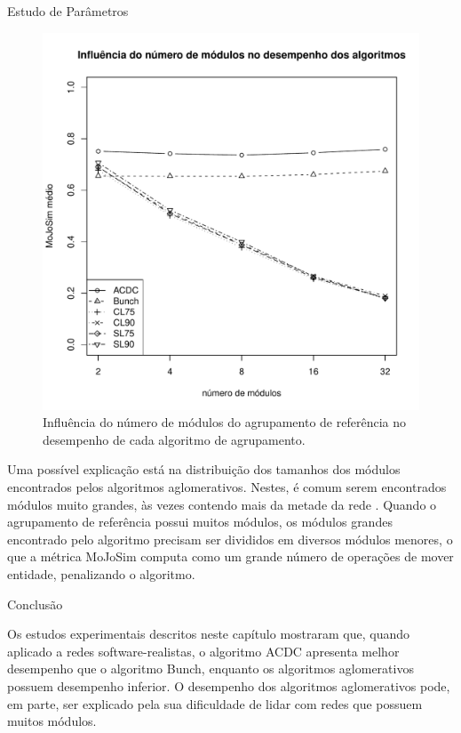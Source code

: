 \begin{section}{Estudo de Parâmetros}
\begin{figure}[htbp]
	\centering
		\includegraphics[scale=0.5]{figuras/mojosim-vs-modules}
	\caption{Influência do número de módulos do agrupamento de referência no desempenho de cada algoritmo de agrupamento.}
	\label{fig:mojosim-vs-modules}
\end{figure}

Uma possível explicação está na distribuição dos tamanhos dos módulos encontrados pelos algoritmos aglomerativos. Nestes, é comum serem encontrados módulos muito grandes, às vezes contendo mais da metade da rede \cite{Wu2005}. Quando o agrupamento de referência possui muitos módulos, os módulos grandes encontrado pelo algoritmo precisam ser divididos em diversos módulos menores, o que a métrica MoJoSim computa como um grande número de operações de mover entidade, penalizando o algoritmo.


\end{section}

\begin{section}{Conclusão}

Os estudos experimentais descritos neste capítulo mostraram que, quando aplicado a redes software-realistas, o algoritmo ACDC apresenta melhor desempenho que o algoritmo Bunch, enquanto os algoritmos aglomerativos possuem desempenho inferior. O desempenho dos algoritmos aglomerativos pode, em parte, ser explicado pela sua dificuldade de lidar com redes que possuem muitos módulos. 

\end{section}
